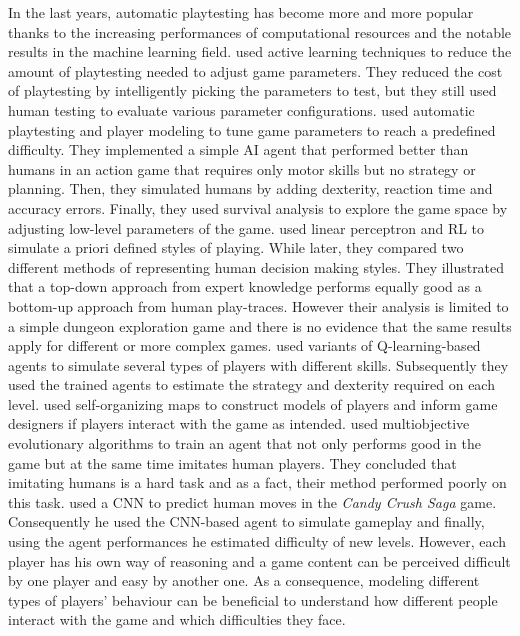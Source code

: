In the last years, automatic playtesting has become more and more popular thanks to the increasing performances of computational resources and the notable results in the machine learning field. \textcite{zook_automatic_2014} used active learning techniques to reduce the amount of playtesting needed to adjust game parameters. They reduced the cost of playtesting by intelligently picking the parameters to test, but they still used human testing to evaluate various parameter configurations. \textcite{isaksen_exploring_2015} used automatic playtesting and player modeling to tune game parameters to reach a predefined difficulty. They implemented a simple AI agent that performed better than humans in an action game that requires only motor skills but no strategy or planning. Then, they simulated humans by adding dexterity, reaction time and accuracy errors. Finally, they used survival analysis to explore the game space by adjusting low-level parameters of the game. \textcite{holmgard_evolving_2014} used linear perceptron and \acf{RL} to simulate a priori defined styles of playing. While later, \cite{holmgard_evolving_2016} they compared two different methods of representing human decision making styles. They illustrated that a top-down approach from expert knowledge performs equally good as a bottom-up approach from human play-traces. However their analysis is limited to a simple dungeon exploration game and there is no evidence that the same results apply for different or more complex games. \textcite{isaksen_simulating_2017} used variants of Q-learning-based agents to simulate several types of players with different skills. Subsequently they used the trained agents to estimate the strategy and dexterity required on each level. \textcite{drachen_player_2009} used self-organizing maps to construct models of players and inform game designers if players interact with the game as intended. \textcite{hoorn_robust_2009} used multiobjective evolutionary algorithms to train an agent that not only performs good in the game but  at the same time imitates human players. They concluded that imitating humans is a hard task and as a fact, their method performed poorly on this task. \textcite{eisen_simulating_2017} used a \acf{CNN} to predict human moves in the \textit{Candy Crush Saga} game. Consequently he used the \acs{CNN}-based agent to simulate gameplay and finally, using the agent performances he estimated difficulty of new levels. However, each player has his own way of reasoning and a game content can be perceived difficult by one player and easy by another one. As a consequence, modeling different types of players' behaviour can be beneficial to understand how different people interact with the game and which difficulties they face.
 
